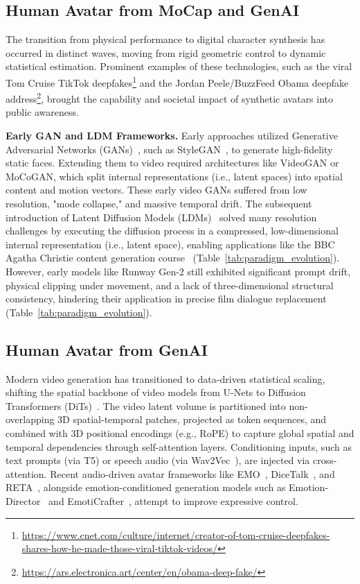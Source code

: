 \documentclass[pdflatex,sn-mathphys-num]{sn-jnl}
\theoremstyle{thmstyleone}
\theoremstyle{thmstyletwo}
\theoremstyle{thmstylethree}
\begin{document}
\subsection{Human Avatar from MoCap and GenAI}\label{sec:face_gen_mocap}
The transition from physical performance to digital character synthesis has occurred in distinct waves, moving from rigid geometric control to dynamic statistical estimation. Prominent examples of these technologies, such as the viral Tom Cruise TikTok deepfakes\footnote{\url{https://www.cnet.com/culture/internet/creator-of-tom-cruise-deepfakes-shares-how-he-made-those-viral-tiktok-videos/}} and the Jordan Peele/BuzzFeed Obama deepfake address\footnote{\url{https://ars.electronica.art/center/en/obama-deep-fake/}}, brought the capability and societal impact of synthetic avatars into public awareness.

\textbf{Early GAN and LDM Frameworks.} Early approaches utilized Generative Adversarial Networks (GANs)~\cite{goodfellow2014generative}, such as StyleGAN~\cite{karras2019style}, to generate high-fidelity static faces. Extending them to video required architectures like VideoGAN or MoCoGAN, which split internal representations (i.e., latent spaces) into spatial content and motion vectors. These early video GANs suffered from low resolution, "mode collapse," and massive temporal drift. The subsequent introduction of Latent Diffusion Models (LDMs)~\cite{rombach2022high} solved many resolution challenges by executing the diffusion process in a compressed, low-dimensional internal representation (i.e., latent space), enabling applications like the BBC Agatha Christie content generation course~\cite{bbcmaestroagatha} (Table~\ref{tab:paradigm_evolution}). However, early models like Runway Gen-2 still exhibited significant prompt drift, physical clipping under movement, and a lack of three-dimensional structural consistency, hindering their application in precise film dialogue replacement~\cite{truesyncdialogue} (Table~\ref{tab:paradigm_evolution}).

\subsection{Human Avatar from GenAI}\label{sec:human_video_gen}

Modern video generation has transitioned to data-driven statistical scaling, shifting the spatial backbone of video models from U-Nets to Diffusion Transformers (DiTs)~\cite{peebles2023scalable}. The video latent volume is partitioned into non-overlapping 3D spatial-temporal patches, projected as token sequences, and combined with 3D positional encodings (e.g., RoPE) to capture global spatial and temporal dependencies through self-attention layers. Conditioning inputs, such as text prompts (via T5) or speech audio (via Wav2Vec~\cite{baevski2020wav2vec}), are injected via cross-attention. Recent audio-driven avatar frameworks like EMO~\cite{tian2024emo}, DiceTalk~\cite{dicetalk2025}, and RETA~\cite{reta2026}, alongside emotion-conditioned generation models such as Emotion-Director~\cite{emotiondirector2025} and EmotiCrafter~\cite{emoticrafter2025}, attempt to improve expressive control.
\end{document}
